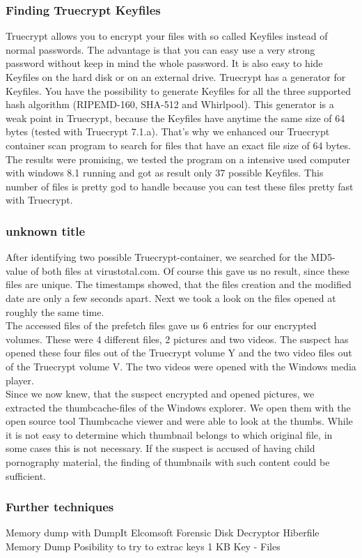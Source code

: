 \subsubsection{Finding Truecrypt Keyfiles}
Truecrypt allows you to encrypt your files with so called Keyfiles instead of normal passwords. The advantage is that you can easy use a very strong password without keep in mind the whole password. It is also easy to hide Keyfiles on the hard disk or on an external drive. Truecrypt has a generator for Keyfiles. You have the possibility to generate Keyfiles for all the three supported hash algorithm (RIPEMD-160, SHA-512 and Whirlpool). This generator is a weak point in Truecrypt, because the Keyfiles have anytime the same size of 64 bytes (tested with Truecrypt 7.1.a). That's why we enhanced our Truecrypt container scan program to search for files that have an exact file size of 64 bytes.
\\
The results were promising, we tested the program on a intensive used computer with windows 8.1 running and got as result only 37 possible Keyfiles. This number of files is pretty god to handle because you can test these files pretty fast with Truecrypt.
\subsubsection{unknown title}
After identifying two possible Truecrypt-container, we searched for the MD5-value of both files at virustotal.com. Of course this gave us no result, since these files are unique. The timestamps showed, that the files creation and the modified date are only a few seconds apart. Next we took a look on the files opened at roughly the same time. 
\\
The accessed files of the prefetch files gave us 6 entries for our encrypted volumes. These were 4 different files, 2 pictures and two videos.
The suspect has opened these four files out of the Truecrypt volume Y and the two video files out of the Truecrypt volume V. The two videos were opened with the Windows media player.
\\
Since we now knew, that the suspect encrypted and opened pictures, we extracted the thumbcache-files of the Windows explorer. We open them with the open source tool Thumbcache viewer and were able to look at the thumbs. While it is not easy to determine which thumbnail belongs to which original file, in some cases this is not necessary. If the suspect is accused of having child pornography material, the finding of thumbnails with such content could be sufficient.

\subsubsection{Further techniques}
Memory dump with DumpIt
Elcomsoft Forensic Disk Decryptor
Hiberfile
Memory Dump 
Posibility to try to extrac keys 
1 KB Key - Files


